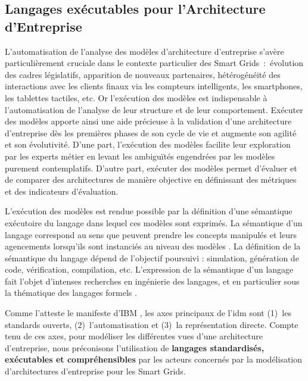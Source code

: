 %
%
%
%
%
%
%



\subsection{Langages exécutables pour l'Architecture d'Entreprise}

L'automatisation de l'analyse des modèles d'architecture d'entreprise s'avère particulièrement cruciale dans le contexte particulier des Smart Grids~:~évolution des cadres législatifs,  apparition de nouveaux partenaires, hétérogénéité des interactions avec les clients finaux via les compteurs intelligents, les smartphones, les tablettes tactiles, etc. Or l'exécution des modèles est indispensable à l'automatisation de l'analyse de leur structure et de leur comportement. Exécuter des modèles apporte ainsi une aide précieuse à la validation d'une architecture d'entreprise dès les premières phases de son cycle de vie et augmente son agilité et son évolutivité. D'une part, l'exécution des modèles facilite leur exploration  par les experts métier en levant les ambiguïtés engendrées par les modèles purement contemplatifs. D'autre part, exécuter des modèles permet d'évaluer et de comparer des architectures de manière objective en définissant des métriques et des indicateurs d'évaluation. 

L'exécution des modèles est rendue possible par la définition d'une sémantique exécutoire du langage dans lequel ces modèles sont exprimés. La sémantique d'un langage correspond au sens que peuvent prendre les concepts manipulés et leurs agencements lorsqu'ils sont instanciés au niveau des modèles \cite{jezequel2012ingenierie}. La définition de la sémantique du langage dépend de l'objectif poursuivi : simulation, génération de code, vérification, compilation, etc. L'expression de la sémantique d'un langage fait l'objet d'intenses recherches en ingénierie des langages, et en particulier sous la thématique des langages formels \cite{kleppe2007language}. 

Comme l'atteste le manifeste d'IBM \cite{chesbrough2006research}, les axes principaux de l'\gls{idm} sont (1)~les standards ouverts, (2)~l'automatisation et (3)~la représentation directe. Compte tenu de ces axes, pour modéliser les différentes vues d'une architecture d'entreprise, nous préconisons l'utilisation de \textbf{langages standardisés, exécutables et compréhensibles} par les acteurs concernés par la modélisation d'architectures d'entreprise pour les Smart Grids. 

